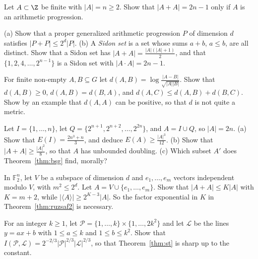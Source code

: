 \begin{exercise}[$\star$]\label{ex:inverse}
Let $A\subset\Z$ be finite with $|A|=n\ge2$. Show that $|A+A|=2n-1$ only if $A$ is an arithmetic progression.
\end{exercise}

\begin{exercise}[$\star$]\label{ex:gap}
(a) Show that a proper generalized arithmetic progression $P$ of dimension $d$ satisfies $|P+P|\le2^d|P|$.
(b) A \emph{Sidon set} is a set whose sums $a+b$, $a\le b$, are all distinct. Show that a Sidon set has $|A+A|=\frac{|A|(|A|+1)}2$, and that $\{1,2,4,\dots,2^{n-1}\}$ is a Sidon set with $|A\cdot A|=2n-1$.
\end{exercise}

\begin{exercise}[$\star\star$]\label{ex:ruzsadist}
For finite non-empty $A,B\subseteq G$ let $d(A,B)=\log\frac{|A-B|}{\sqrt{|A||B|}}$. Show that $d(A,B)\ge0$, $d(A,B)=d(B,A)$, and $d(A,C)\le d(A,B)+d(B,C)$. Show by an example that $d(A,A)$ can be positive, so that $d$ is not quite a metric.
\end{exercise}

\begin{exercise}[$\star\star$]\label{ex:energy}
Let $I=\{1,\dots,n\}$, let $Q=\{2^{n+1},2^{n+2},\dots,2^{2n}\}$, and $A=I\cup Q$, so $|A|=2n$.
(a) Show that $E(I)=\frac{2n^3+n}3$, and deduce $E(A)\ge\frac{|A|^3}{12}$.
(b) Show that $|A+A|\ge\frac{|A|^2}8$, so that $A$ has unbounded doubling.
(c) Which subset $A'$ does Theorem~\ref{thm:bsg} find, morally?
\end{exercise}

\begin{exercise}[$\star\star$]\label{ex:freimanbad}
In $\mathbb F_2^n$, let $V$ be a subspace of dimension $d$ and $e_1,\dots,e_m$ vectors independent modulo $V$, with $m^2\le2^d$. Let $A=V\cup\{e_1,\dots,e_m\}$. Show that $|A+A|\le K|A|$ with $K=m+2$, while $|\langle A\rangle|\ge2^{K-3}|A|$. So the factor exponential in $K$ in Theorem~\ref{thm:ruzsaf2} is necessary.
\end{exercise}

\begin{exercise}[$\star\star\star$]\label{ex:stsharp}
For an integer $k\ge1$, let $\mathcal P=\{1,\dots,k\}\times\{1,\dots,2k^2\}$ and let $\mathcal L$ be the lines $y=ax+b$ with $1\le a\le k$ and $1\le b\le k^2$. Show that $I(\mathcal P,\mathcal L)=2^{-2/3}|\mathcal P|^{2/3}|\mathcal L|^{2/3}$, so that Theorem~\ref{thm:st} is sharp up to the constant.
\end{exercise}

